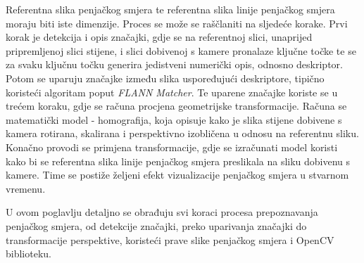 Referentna slika penjačkog smjera te referentna slika linije penjačkog smjera moraju biti iste dimenzije. Proces se može se raščlaniti na sljedeće korake.
Prvi korak je detekcija i opis značajki, gdje se na referentnoj slici, unaprijed pripremljenoj slici stijene, i slici dobivenoj s kamere pronalaze ključne točke te se za svaku ključnu točku generira jedistveni numerički opis, odnosno deskriptor. Potom se uparuju značajke između slika uspoređujući deskriptore, tipično koristeći algoritam poput \textit{FLANN Matcher}. 
Te uparene značajke koriste se u trećem koraku, gdje se računa procjena geometrijske transformacije. Računa se matematički model - homografija, koja opisuje kako je slika stijene dobivene s kamera rotirana, skalirana i perspektivno izobličena u odnosu na referentnu sliku. Konačno provodi se primjena transformacije, gdje se izračunati model koristi kako bi se referentna slika linije penjačkog smjera preslikala na sliku dobivenu s kamere. Time se postiže željeni efekt vizualizacije penjačkog smjera u stvarnom vremenu.

U ovom poglavlju detaljno se obrađuju svi koraci procesa prepoznavanja penjačkog smjera, od detekcije značajki, preko uparivanja značajki do transformacije perspektive, koristeći prave slike penjačkog smjera i OpenCV biblioteku.



